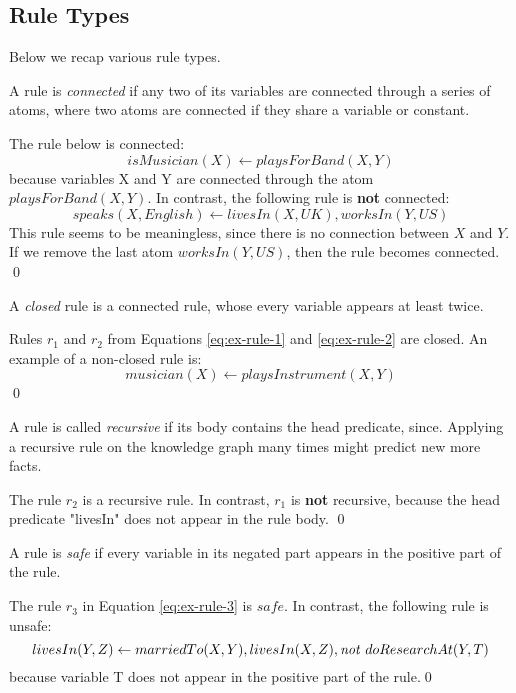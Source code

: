 \subsection{Rule Types}
Below we recap various rule types.
\begin{definition} A rule is \textit{connected} if any two of its variables are connected through a series of atoms, where two atoms are connected if they share a variable or constant.
\end{definition}
\begin{example}
The rule below is connected:
\[isMusician(X) \leftarrow playsForBand(X, Y)\]
because variables X and Y are connected through the atom $playsForBand(X, Y)$. In contrast, the following rule is \textbf{not} connected:
\[speaks(X, English) \leftarrow livesIn(X, UK), worksIn(Y, US)\]
This rule seems to be meaningless, since there is no connection between $X$ and $Y$. If we remove the last atom $worksIn(Y, US)$, then the rule becomes connected. 
\qed
\end{example}
\begin{definition} A \textit{closed} rule is a connected rule, whose every variable appears at least twice.
\end{definition}
\begin{example}
Rules $r_1$ and $r_2$ from Equations \ref{eq:ex-rule-1} and \ref{eq:ex-rule-2} are closed. An example of a non-closed rule is: \[musician(X) \leftarrow playsInstrument(X, Y)\]\qed
\end{example}

\begin{definition} A rule is called \textit{recursive} if its body contains the head predicate, since. Applying a recursive rule on the knowledge graph many times might predict new more facts.
\begin{example}
The rule $r_2$ is a recursive rule. In contrast, $r_1$ is \textbf{not} recursive, because the head predicate "livesIn" does not appear in the rule body. \qed
\end{example}

\end{definition}
\begin{definition} A rule is \textit{safe} if every variable in its negated part appears in the positive part of the rule. %
\end{definition}
\begin{example}
The rule $r_3$ in Equation \ref{eq:ex-rule-3} is $safe$. In contrast, the following rule is unsafe:\[livesIn(Y,Z) \leftarrow marriedTo(X,Y), livesIn(X,Z), \mathit{not}~ doResearchAt(Y,T)\]
because variable T does not appear in the positive part of the rule.\qed
\end{example}
